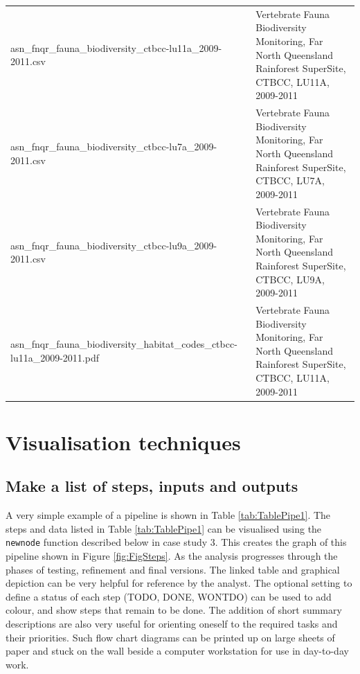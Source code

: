 \documentclass[11pt,a4paper]{article}
\begin{document}
\begin{table}[!h]
\begin{tabular}{p{3.3in}p{3in}}
  asn\_fnqr\_fauna\_biodiversity\_ctbcc-lu11a\_2009-2011.csv & Vertebrate Fauna Biodiversity Monitoring, Far North Queensland Rainforest SuperSite, CTBCC, LU11A, 2009-2011 \\ 
  asn\_fnqr\_fauna\_biodiversity\_ctbcc-lu7a\_2009-2011.csv & Vertebrate Fauna Biodiversity Monitoring, Far North Queensland Rainforest SuperSite, CTBCC, LU7A, 2009-2011 \\ 
  asn\_fnqr\_fauna\_biodiversity\_ctbcc-lu9a\_2009-2011.csv & Vertebrate Fauna Biodiversity Monitoring, Far North Queensland Rainforest SuperSite, CTBCC, LU9A, 2009-2011 \\ 
  asn\_fnqr\_fauna\_biodiversity\_habitat\_codes\_ctbcc-lu11a\_2009-2011.pdf & Vertebrate Fauna Biodiversity Monitoring, Far North Queensland Rainforest SuperSite, CTBCC, LU11A, 2009-2011 \\ 
   \hline
\end{tabular}
\end{table}

\clearpage

\section{Visualisation techniques}\label{visualisation-techniques}

\subsection{Make a list of steps, inputs and
outputs}\label{make-a-list-of-steps-inputs-and-outputs}

A very simple example of a pipeline is shown in Table
\ref{tab:TablePipe1}. The steps and data listed in Table
\ref{tab:TablePipe1} can be visualised using the \texttt{newnode}
function described below in case study 3. This creates the graph of this
pipeline shown in Figure \ref{fig:FigSteps}. As the analysis progresses
through the phases of testing, refinement and final versions. The linked
table and graphical depiction can be very helpful for reference by the
analyst. The optional setting to define a status of each step (TODO,
DONE, WONTDO) can be used to add colour, and show steps that remain to
be done. The addition of short summary descriptions are also very useful
for orienting oneself to the required tasks and their priorities. Such
flow chart diagrams can be printed up on large sheets of paper and stuck
on the wall beside a computer workstation for use in day-to-day work.
\end{document}
